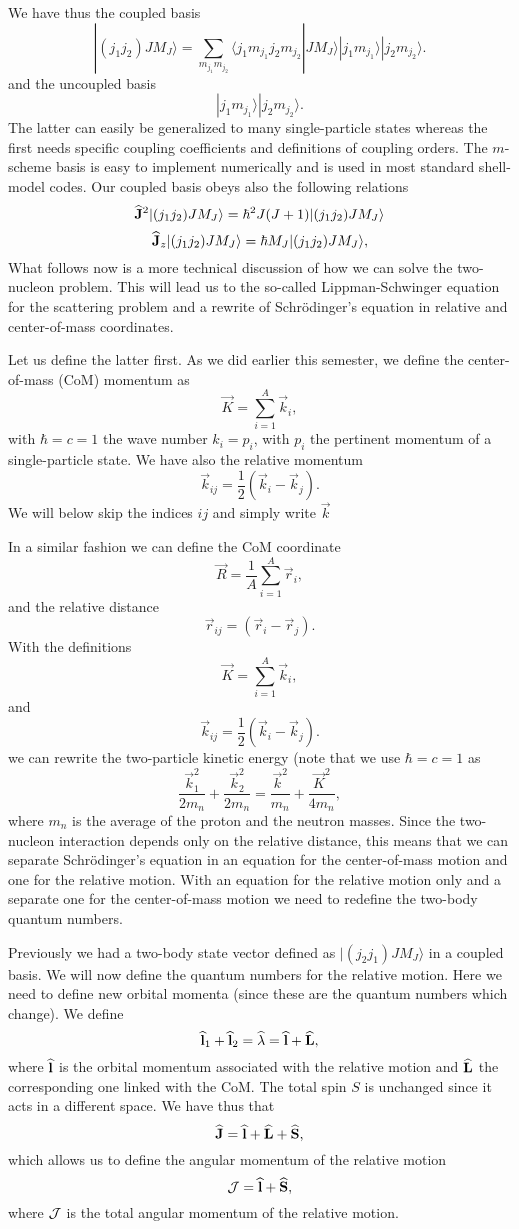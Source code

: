 \begin{enumerate}
We have thus the coupled basis 
\[
|(j_1j_2)JM_J\rangle=\sum_{m_{j_1}m_{j_2}}\langle j_1m_{j_1}j_2m_{j_2}|JM_J\rangle|j_1m_{j_1}\rangle|j_2m_{j_2}\rangle.
\]
and the uncoupled basis 
\[
|j_1m_{j_1}\rangle|j_2m_{j_2}\rangle.
\]
The latter can easily be generalized to many single-particle states whereas the first 
needs specific coupling coefficients and definitions of coupling orders. 
The $m$-scheme basis is easy to implement numerically and is used in most standard shell-model codes. 
Our coupled basis obeys also the following relations
\[
   {\bf\widehat{J}}^2|(j_1j_2)JM_J\rangle=\hbar^2J(J+1)|(j_1j_2)JM_J\rangle
\]
\[
   {\bf\widehat{J}}_z|(j_1j_2)JM_J\rangle=\hbar M_J|(j_1j_2)JM_J\rangle,
\]
What follows now is a more technical discussion of how we can solve the two-nucleon problem.
This will lead us to the so-called Lippman-Schwinger equation for the scattering problem and a rewrite of Schr\"odinger's equation in relative and center-of-mass coordinates. 

Let us define the latter first. As we did earlier this semester, we define
the center-of-mass (CoM)  momentum as
 \[
    \vec{K}=\sum_{i=1}^A\vec{k}_i,
 \]
with $\hbar=c=1$ the wave number $k_i=p_i$, with $p_i$ the pertinent momentum of a single-particle state. 
We have also the relative momentum
\[
    \vec{k}_{ij}=\frac{1}{2}(\vec{k}_i-\vec{k}_j).
 \]
We will below skip the indices $ij$ and simply write $\vec{k}$

 In a similar fashion we can define the CoM coordinate
 \[
     \vec{R}=\frac{1}{A}\sum_{i=1}^{A}\vec{r}_i,
 \]
 and the relative distance 
\[
    \vec{r}_{ij}=(\vec{r}_i-\vec{r}_j).
 \]
With the definitions
 \[
    \vec{K}=\sum_{i=1}^A\vec{k}_i,
 \]
and 
\[
    \vec{k}_{ij}=\frac{1}{2}(\vec{k}_i-\vec{k}_j).
 \]
we can rewrite the two-particle kinetic energy (note that we use $\hbar=c=1$ as 
\[
\frac{\vec{k}_1^2}{2m_n}+\frac{\vec{k}_2^2}{2m_n}=\frac{\vec{k}^2}{m_n}+\frac{\vec{K}^2}{4m_n},
\]
where $m_n$ is the average of the proton and the neutron masses. 
Since the two-nucleon interaction depends only on the relative distance, this means that we can separate Schr\"odinger's equation in an equation for the center-of-mass motion and one for the relative motion.
With an equation for the relative motion only and a separate one for the center-of-mass motion we need to redefine the two-body quantum numbers.

Previously we had a two-body state vector defined as $|(j_2j_1)JM_J\rangle$ in a coupled basis. 
We will now define the quantum numbers for the relative motion. Here we need to define new orbital momenta (since these are the quantum numbers which change). 
We define 
\[
{\bf\widehat{l}}_1+{\bf\widehat{l}}_2={\bf\widehat{\lambda}}={\bf\widehat{l}}+{\bf\widehat{L}},
\]
where ${\bf\widehat{l}}$ is the orbital momentum associated with the relative motion and
${\bf\widehat{L}}$ the corresponding one linked with the CoM. The total spin $S$ is unchanged since it acts in a different space. We have thus that
\[
{\bf\widehat{J}}={\bf\widehat{l}}+{\bf\widehat{L}}+{\bf\widehat{S}},
\]
which allows us to define the angular momentum of the relative motion
\[
{ \cal J} =  {\bf\widehat{l}}+{\bf\widehat{S}},
\]
where ${ \cal J}$ is the total angular momentum of the relative motion.


\end{enumerate}
